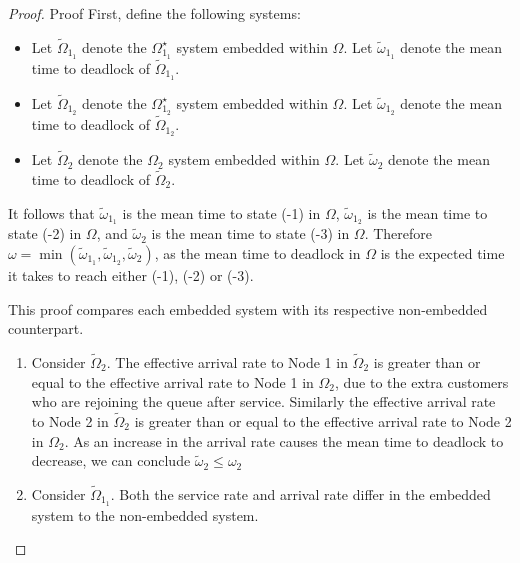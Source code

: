 \documentclass{article}
\numberwithin{equation}{section}
\begin{document}
\begin{proof}{Proof}
First, define the following systems:
\begin{itemize}
  \item Let $\widetilde{\Omega}_{1_1}$ denote the $\Omega_{1_1}^{\star}$ system
  embedded within $\Omega$. Let $\widetilde{\omega}_{1_1}$ denote the mean
  time to deadlock of $\widetilde{\Omega}_{1_1}$.
  \item Let $\widetilde{\Omega}_{1_2}$ denote the $\Omega_{1_2}^{\star}$ system
  embedded within $\Omega$. Let $\widetilde{\omega}_{1_2}$ denote the mean
  time to deadlock of $\widetilde{\Omega}_{1_2}$.
  \item Let $\widetilde{\Omega}_2$ denote the $\Omega_2$ system embedded
  within $\Omega$. Let $\widetilde{\omega}_2$ denote the mean time to deadlock
  of $\widetilde{\Omega}_2$.
\end{itemize}

It follows that $\widetilde{\omega}_{1_1}$ is the mean time to state (-1) in
$\Omega$, $\widetilde{\omega}_{1_2}$ is the mean time to state (-2) in
$\Omega$, and $\widetilde{\omega}_2$ is the mean time to state (-3) in
$\Omega$.
Therefore $\omega = \min(\widetilde{\omega}_{1_1}, \widetilde{\omega}_{1_2},
\widetilde{\omega}_2)$, as the mean time to deadlock in $\Omega$ is the
expected time it takes to reach either (-1), (-2) or (-3).

This proof compares each embedded system with its respective non-embedded
counterpart.

\begin{enumerate}

\item Consider $\widetilde{\Omega}_2$.
The effective arrival rate to Node 1 in $\widetilde{\Omega}_2$ is greater than
or equal to the effective arrival rate to Node 1 in $\Omega_2$, due to the
extra customers who are rejoining the queue after service.
Similarly the effective arrival rate to Node 2 in $\widetilde{\Omega}_2$ is
greater than or equal to the effective arrival rate to Node 2 in $\Omega_2$.
As an increase in the arrival rate causes the mean time to deadlock to
decrease, we can conclude $\widetilde{\omega}_2 \leq \omega_2$

\item Consider $\widetilde{\Omega}_{1_1}$. Both the service rate and arrival
rate differ in the embedded system to the non-embedded system.

\begin{itemize}


\end{itemize}
\end{enumerate}
\end{proof}
\end{document}
